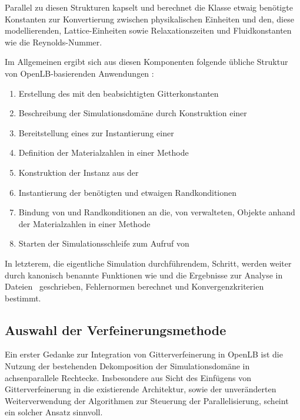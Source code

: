 Parallel zu diesen Strukturen kapselt und berechnet die  Klasse etwaig benötigte Konstanten zur Konvertierung zwischen physikalischen Einheiten und den, diese modellierenden, Lattice-Einheiten sowie Relaxationszeiten und Fluidkonstanten wie die Reynolds-Nummer.

\bigskip
Im Allgemeinen ergibt sich aus diesen Komponenten folgende übliche Struktur von OpenLB-basierenden Anwendungen \cite[Kap.~2.1]{olb12userguide}:
\begin{enumerate}
	\item Erstellung des  mit den beabsichtigten Gitterkonstanten
	\item Beschreibung der Simulationsdomäne durch Konstruktion einer 
	\item Bereitstellung eines  zur Instantierung einer 
	\item Definition der Materialzahlen in einer  Methode
	\item Konstruktion der  Instanz aus der 
	\item Instantierung der benötigten  und etwaigen Randkonditionen
	\item Bindung von  und Randkonditionen an die, von  verwalteten,  Objekte anhand der Materialzahlen in einer  Methode
	\item Starten der Simulationsschleife zum Aufruf von 
\end{enumerate}

In letzterem, die eigentliche Simulation durchführendem, Schritt, werden weiter durch kanonisch benannte Funktionen wie  und  die Ergebnisse zur Analyse in Dateien~\cite{vtkGuide10} geschrieben, Fehlernormen berechnet und Konvergenzkriterien bestimmt.

\subsection{Auswahl der Verfeinerungsmethode}
\label{sec:olbRefinementChoice}

Ein erster Gedanke zur Integration von Gitterverfeinerung in OpenLB ist die Nutzung der bestehenden Dekomposition der Simulationsdomäne in achsenparallele Rechtecke. Insbesondere aus Sicht des Einfügens von Gitterverfeinerung in die existierende Architektur, sowie der unveränderten Weiterverwendung der  Algorithmen zur Steuerung der Parallelisierung, scheint ein solcher Ansatz sinnvoll.

